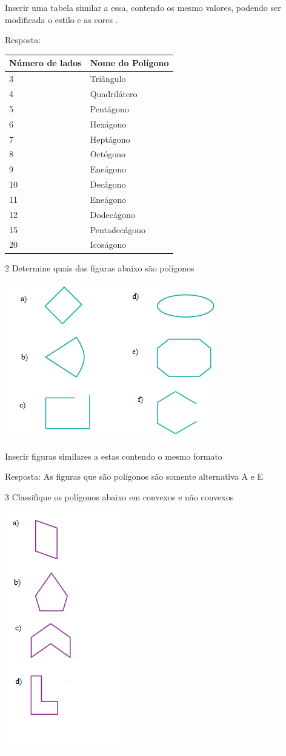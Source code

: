 Inserir uma tabela similar a essa, contendo os mesmo valores, podendo
ser modificada o estilo e as cores .

Resposta:

\begin{longtable}[]{@{}ll@{}}
\toprule
Número de lados & Nome do Polígono\tabularnewline
\midrule
\endhead
3 & Triângulo\tabularnewline
4 & Quadrilátero\tabularnewline
5 & Pentágono\tabularnewline
6 & Hexágono\tabularnewline
7 & Heptágono\tabularnewline
8 & Octógono\tabularnewline
9 & Eneágono\tabularnewline
10 & Decágono\tabularnewline
11 & Eneágono\tabularnewline
12 & Dodecágono\tabularnewline
15 & Pentadecágono\tabularnewline
20 & Icoságono\tabularnewline
\bottomrule
\end{longtable}

\num{2} Determine quais das figuras abaixo são polígonos

\includegraphics[width=1\times 7in,height=1\times 26763in]{./imgSAEB_8_MAT/media/image7.png}

Inserir figuras similares a estas contendo o mesmo formato

Resposta: As figuras que são polígonos são somente alternativa A e E

\num{3} Classifique os polígonos abaixo em convexos e não convexos

\includegraphics[width=1\times 16236in,height=2\times 36667in]{./imgSAEB_8_MAT/media/image8.png}

